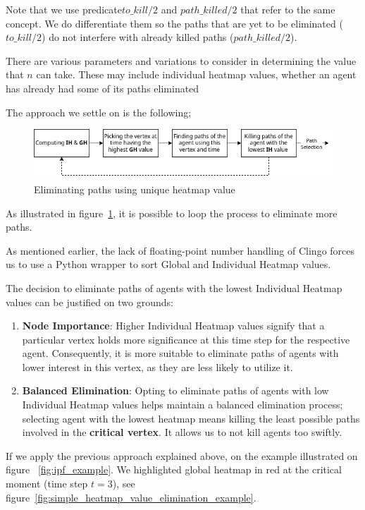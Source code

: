 Note that we use predicate\(to\_kill/2\) and \(path\_killed/2\) that refer to the same concept. We do differentiate them so the paths that are yet to be eliminated (\(to\_kill/2\)) do not interfere with already killed paths (\(path\_killed/2\)).  

There are various parameters and variations to consider in determining the value that \(n\) can take. These may include individual heatmap values, whether an agent has already had some of its paths eliminated

The approach we settle on is the following;

\begin{figure}[H]
    \centering
    \caption{Eliminating paths using unique heatmap value}\label{fig:simple_heatmap_value_elimination}
    \includegraphics[width=\widthimg]{img/simple_heatmap_value.drawio.png}
\end{figure}

As illustrated in figure~\ref{fig:simple_heatmap_value_elimination}, it is possible to loop the process to eliminate more paths. 

As mentioned earlier, the lack of floating-point number handling of Clingo forces us to use a Python wrapper to sort Global and Individual Heatmap values.

The decision to eliminate paths of agents with the lowest Individual Heatmap values can be justified on two grounds:
\begin{enumerate}
    \item \textbf{Node Importance}: Higher Individual Heatmap values signify that a particular vertex holds more significance at this time step for the respective agent. Consequently, it is more suitable to eliminate paths of agents with lower interest in this vertex, as they are less likely to utilize it.
    \item \textbf{Balanced Elimination}: Opting to eliminate paths of agents with low Individual Heatmap values helps maintain a balanced elimination process; selecting agent with the lowest heatmap means killing the least possible paths involved in the \textbf{critical vertex}. It allows us to not kill agents too swiftly. 
\end{enumerate}

If we apply the previous approach explained above, on the example illustrated on figure ~\ref{fig:ipf_example}. We highlighted global heatmap in red at the critical moment (time step \(t=3\)), see figure~\ref{fig:simple_heatmap_value_elimination_example}. 

